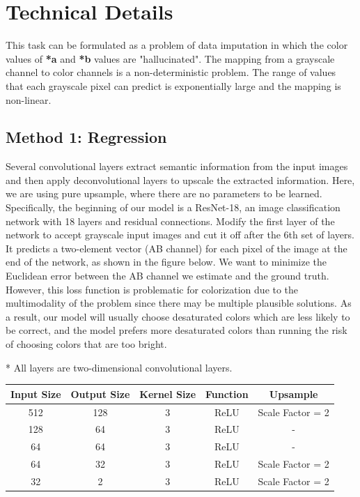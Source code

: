 \documentclass{article}
\begin{document}
\section{Technical Details}
This task can be formulated as a problem of data imputation in which the color values of \textbf{*a} and \textbf{*b} values are "hallucinated".
The mapping from a grayscale channel to color channels is a non-deterministic problem. 
The range of values that each grayscale pixel can predict is exponentially large and the mapping is non-linear. 

\subsection{Method 1: Regression}
Several convolutional layers extract semantic information from the input images and then apply deconvolutional layers to upscale the extracted information.
Here, we are using pure upsample, where there are no parameters to be learned.
Specifically, the beginning of our model is a ResNet-18, an image classification network with 18 layers and residual connections. 
Modify the first layer of the network to accept grayscale input images and cut it off after the 6th set of layers. 
It predicts a two-element vector (AB channel) for each pixel of the image at the end of the network, as shown in the figure below. We want to minimize the Euclidean error between the AB channel we estimate and the ground truth. However, this loss function is problematic for colorization due to the multimodality of the problem since there may be multiple plausible solutions.
As a result, our model will usually choose desaturated colors which are less likely to be correct, and the model prefers more desaturated colors than running the risk of choosing colors that are too bright.

* All layers are two-dimensional convolutional layers.

\begin{center}
    \begin{tabular}{ |c|c|c|c|c| } 
    \hline
    Input Size & Output Size & Kernel Size & Function & Upsample \\
    \hline
    512 & 128 & 3 & ReLU & Scale Factor = 2 \\ 
    128 & 64 & 3 & ReLU & - \\ 
    64 & 64 & 3 & ReLU &  - \\ 
    64 & 32 & 3 & ReLU & Scale Factor = 2 \\ 
    32 & 2 & 3 & ReLU & Scale Factor = 2 \\ 
    
    \hline
    
    \end{tabular}
    
    \end{center}
\end{document}
